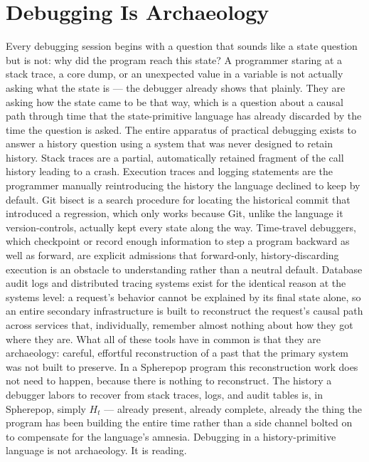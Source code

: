 \documentclass[11pt]{article}
\begin{document}
\section{Debugging Is Archaeology}

Every debugging session begins with a question that sounds like a state question but is not: why did the program reach this state? A programmer staring at a stack trace, a core dump, or an unexpected value in a variable is not actually asking what the state is --- the debugger already shows that plainly. They are asking how the state came to be that way, which is a question about a causal path through time that the state-primitive language has already discarded by the time the question is asked. The entire apparatus of practical debugging exists to answer a history question using a system that was never designed to retain history. Stack traces are a partial, automatically retained fragment of the call history leading to a crash. Execution traces and logging statements are the programmer manually reintroducing the history the language declined to keep by default. Git bisect is a search procedure for locating the historical commit that introduced a regression, which only works because Git, unlike the language it version-controls, actually kept every state along the way. Time-travel debuggers, which checkpoint or record enough information to step a program backward as well as forward, are explicit admissions that forward-only, history-discarding execution is an obstacle to understanding rather than a neutral default. Database audit logs and distributed tracing systems exist for the identical reason at the systems level: a request's behavior cannot be explained by its final state alone, so an entire secondary infrastructure is built to reconstruct the request's causal path across services that, individually, remember almost nothing about how they got where they are. What all of these tools have in common is that they are archaeology: careful, effortful reconstruction of a past that the primary system was not built to preserve. In a Spherepop program this reconstruction work does not need to happen, because there is nothing to reconstruct. The history a debugger labors to recover from stack traces, logs, and audit tables is, in Spherepop, simply $H_t$ --- already present, already complete, already the thing the program has been building the entire time rather than a side channel bolted on to compensate for the language's amnesia. Debugging in a history-primitive language is not archaeology. It is reading.
\end{document}
